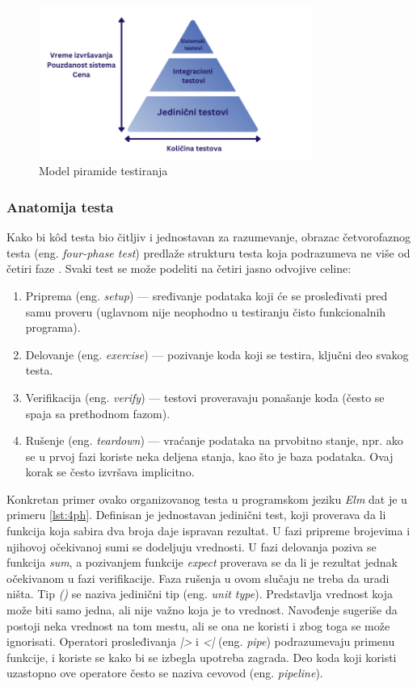 \documentclass[12pt,oneside]{memoir}
\begin{document}
\begin{figure}[!ht]
  \centering
  \label{fig:piramida}
  \includegraphics[width=0.8\textwidth]{piramidanova.png}
  \caption{Model piramide testiranja}
\end{figure}

\subsubsection{Anatomija testa}
\par Kako bi k\^{o}d testa bio čitljiv i jednostavan za razumevanje, obrazac četvorofaznog testa (eng. \emph{four-phase test}) predlaže strukturu testa koja podrazumeva ne više od četiri faze \cite{4phase}. Svaki test se može podeliti na četiri jasno odvojive celine:  
\begin{enumerate}
\item Priprema (eng. \emph{setup}) --- sređivanje podataka koji će se prosleđivati pred samu proveru (uglavnom nije neophodno u testiranju čisto funkcionalnih programa).
\item Delovanje (eng. \emph{exercise}) --- pozivanje koda koji se testira, ključni deo svakog testa.
\item Verifikacija (eng. \emph{verify}) --- testovi proveravaju ponašanje koda (često se spaja sa prethodnom fazom). 
\item Rušenje (eng. \emph{teardown}) --- vraćanje podataka na prvobitno stanje, npr. ako se u prvoj fazi koriste neka deljena stanja, kao što je baza podataka. Ovaj korak se često izvršava implicitno. 
\end{enumerate}

\par Konkretan primer ovako organizovanog testa u programskom jeziku \emph{Elm} dat je u primeru \ref{lst:4ph}. Definisan je jednostavan jedinični test, koji proverava da li funkcija koja sabira dva broja daje ispravan rezultat. U fazi pripreme brojevima i njihovoj očekivanoj sumi se dodeljuju vrednosti. U fazi delovanja poziva se funkcija \emph{sum}, a pozivanjem funkcije \emph{expect} proverava se da li je rezultat jednak očekivanom u fazi verifikacije. Faza rušenja u ovom slučaju ne treba da uradi ništa. Tip \emph{()} se naziva jedinični tip (eng. \emph{unit type}). Predstavlja vrednost koja može biti samo jedna, ali nije važno koja je to vrednost. Navođenje \emph{\textunderscore} sugeriše da postoji neka vrednost na tom mestu, ali se ona ne koristi i zbog toga se može ignorisati. Operatori prosleđivanja \emph{|>} i \emph{<|} (eng. \emph{pipe}) podrazumevaju primenu funkcije, i koriste se kako bi se izbegla upotreba zagrada. Deo koda koji koristi uzastopno ove operatore često se naziva cevovod (eng. \emph{pipeline}). 
\end{document}
